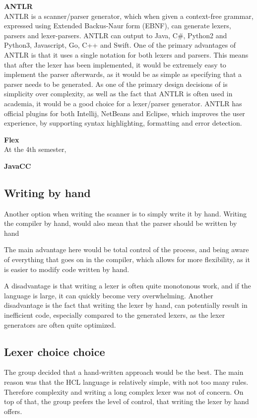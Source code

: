 \textbf{ANTLR}\\
ANTLR is a scanner/parser generator, which when given a context-free grammar, expressed using Extended Backus-Naur form (EBNF), can generate lexers, parsers and lexer-parsers\cite{ANTLR}.
ANTLR can output to Java, C\#, Python2 and Python3, Javascript, Go, C++ and Swift\cite{ANTLRDocsTargets}.
One of the primary advantages of ANTLR is that it uses a single notation for both lexers and parsers\cite{ANTLRDocs}.
This means that after the lexer has been implemented, it would be extremely easy to implement the parser afterwards, as it would be as simple as specifying that a parser needs to be generated.
As one of the primary design decisions of is simplicity over complexity, as well as the fact that ANTLR is often used in academia, it would be a good choice for a lexer/parser generator.
ANTLR has official plugins for both Intellij, NetBeans and Eclipse, which improves the user experience, by supporting syntax highlighting, formatting and error detection.

\textbf{Flex}\\
At the 4th semester,

\textbf{JavaCC}\\


\subsection{Writing by hand}
Another option when writing the scanner is to simply write it by hand.
Writing the compiler by hand, would also mean that the parser should be written by hand

The main advantage here would be total control of the process, and being aware of everything that goes on in the compiler, which allows for more flexibility, as it is easier to modify code written by hand.

A disadvantage is that writing a lexer is often quite monotonous work, and if the language is large, it can quickly become very overwhelming.
Another disadvantage is the fact that writing the lexer by hand, can potentially result in inefficient code, especially compared to the generated lexers, as the lexer generators are often quite optimized.

\subsection{Lexer choice choice}
\label{LexerChoice}
The group decided that a hand-written approach would be the best.
The main reason was that the HCL language is relatively simple, with not too many rules.
Therefore complexity and writing a long complex lexer was not of concern.
On top of that, the group prefers the level of control, that writing the lexer by hand offers.


